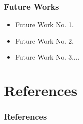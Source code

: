 \documentclass[t,10pt]{beamer}
\begin{document}
\begin{frame}
  \frametitle{Future Works}
  \begin{itemize}
      \item{Future Work No. 1.}
      \item{Future Work No. 2.}
      \item{Future Work No. 3....} 
  \end{itemize}
\end{frame}

\section{References}

\begin{frame}[allowframebreaks]
        \frametitle{References }
        
        
\end{frame}
\end{document}
